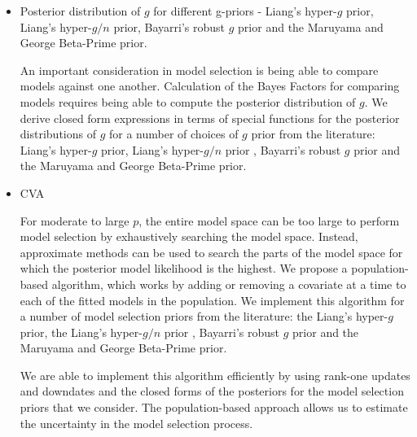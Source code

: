 \begin{itemize}
	\item Posterior distribution of $g$ for different g-priors - Liang's hyper-$g$ prior, Liang's hyper-$g/n$ prior,
	Bayarri's robust $g$ prior and the Maruyama and George Beta-Prime prior.

	An important consideration in model selection is being able to compare models against one another.
	Calculation of the Bayes Factors for comparing models requires being able to compute the posterior
	distribution of $g$. We derive closed form expressions in terms of special functions for the posterior
	distributions of $g$ for a number of choices of $g$ prior from the literature:
	Liang's hyper-$g$ prior,
	Liang's hyper-$g/n$ prior \citep{Liang2008},
	Bayarri's robust $g$ prior \citep{Bayarri2012} and the 
	Maruyama and George Beta-Prime \citep{Maruyama2011}prior.	

	\item CVA
	
	For moderate to large $p$, the entire model space can be too large to perform model selection by
	exhaustively searching the model space. Instead, approximate methods can be used to search the parts of the
	model space for which the posterior model likelihood is the highest. We propose a population-based algorithm,
	which works by adding or removing a covariate at a time to each of the fitted models in the population.
	We implement this algorithm for a number of model selection priors from the literature:
	the Liang's hyper-$g$ prior,
	the Liang's hyper-$g/n$ prior \citep{Liang2008},
	Bayarri's robust $g$ prior \citep{Bayarri2012} and the 
	Maruyama and George Beta-Prime \citep{Maruyama2011} prior.	

	We are able to implement this algorithm efficiently by using rank-one updates and downdates and the closed
	forms of the posteriors for the model selection priors that we consider. The population-based approach allows
	us to estimate the uncertainty in the model selection process.

\end{itemize}

